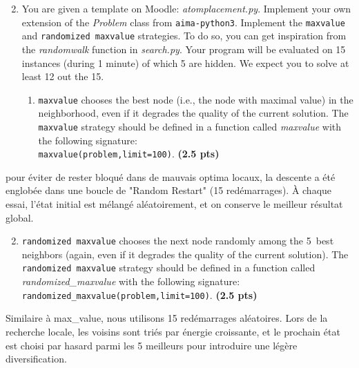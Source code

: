 \documentclass[11pt,a4paper]{report}
\begin{document}
\begin{enumerate}
\setcounter{enumi}{1}
    \item You are given a template on Moodle: \textit{atomplacement.py}. Implement your own extension of the \textit{Problem} class from \texttt{aima-python3}. Implement the \texttt{maxvalue} and \texttt{randomized maxvalue} strategies. To do so,
	you can get inspiration from the \textit{randomwalk} function in \textit{search.py}. Your program will be evaluated on 15 instances (during 1 minute) of which 5 are hidden. We expect you to solve at least 12 out the 15.
    \begin{enumerate}
        \item \texttt{maxvalue} chooses the best node (i.e., the node with maximal
        value) in the neighborhood, even if it degrades the quality of the current solution. 
        The \texttt{maxvalue} strategy should be defined in a function called
        \textit{maxvalue} with the following signature: \\
        \texttt{maxvalue(problem,limit=100)}. \textbf{(2.5 pts)}
    \end{enumerate}
\end{enumerate}

\begin{answers}[2.5 cm]
pour éviter de rester bloqué dans de mauvais optima locaux, la descente a été englobée dans une boucle de "Random Restart" (15 redémarrages). À chaque essai, l'état initial est mélangé aléatoirement, et on conserve le meilleur résultat global.
\end{answers}



\begin{enumerate}
\setcounter{enumi}{1}
\begin{enumerate}
\setcounter{enumii}{1}
    \item \texttt{randomized maxvalue} chooses the next node randomly among
        the 5~best neighbors (again, even if it degrades the quality of the current solution).
        The \texttt{randomized maxvalue} strategy should be defined in a function called
        \textit{randomized\_maxvalue} with the following signature: \\
        \texttt{randomized\_maxvalue(problem,limit=100)}. \textbf{(2.5 pts)}
\end{enumerate}
\end{enumerate}

\begin{answers}[2.5 cm]
Similaire à max\_value, nous utilisons 15 redémarrages aléatoires. Lors de la recherche locale, les voisins sont triés par énergie croissante, et le prochain état est choisi par hasard parmi les 5 meilleurs pour introduire une légère diversification.
\end{answers}
\end{document}
